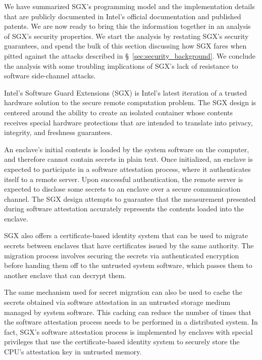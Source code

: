 \label{sec:sgx_security_analysis}

We have summarized SGX's programming model and the implementation details
that are publicly documented in Intel's official documentation and published
patents. We are now ready to bring this the information together in an analysis
of SGX's security properties.  We start the analysis by restating SGX's
security guarantees, and spend the bulk of this section discussing how SGX
fares when pitted against the attacks described in
\S~\ref{sec:security_background}. We conclude the analysis with some troubling
implications of SGX's lack of resistance to software side-channel attacks.



Intel's Software Guard Extensions (SGX) is Intel's latest iteration of a
trusted hardware solution to the secure remote computation problem. The SGX
design is centered around the ability to create an isolated container whose
contents receives special hardware protections that are intended to translate
into privacy, integrity, and freshness guarantees.


An enclave's initial contents is loaded by the system software on the computer,
and therefore cannot contain secrets in plain text. Once initialized, an
enclave is expected to participate in a software attestation process, where it
authenticates itself to a remote server. Upon successful authentication, the
remote server is expected to disclose some secrets to an enclave over a
secure communication channel. The SGX design attempts to guarantee that the
measurement presented during software attestation accurately represents the
contents loaded into the enclave.

SGX also offers a certificate-based identity system that can be used to migrate
secrets between enclaves that have certificates issued by the same authority.
The migration process involves securing the secrets via authenticated
encryption before handing them off to the untrusted system software, which
passes them to another enclave that can decrypt them.

The same mechanism used for secret migration can also be used to cache the
secrets obtained via software attestation in an untrusted storage medium
managed by system software. This caching can reduce the number of times that
the software attestation process needs to be performed in a distributed system.
In fact, SGX's software attestation process is implemented by enclaves with
special privileges that use the certificate-based identity system to securely
store the CPU's attestation key in untrusted memory.


